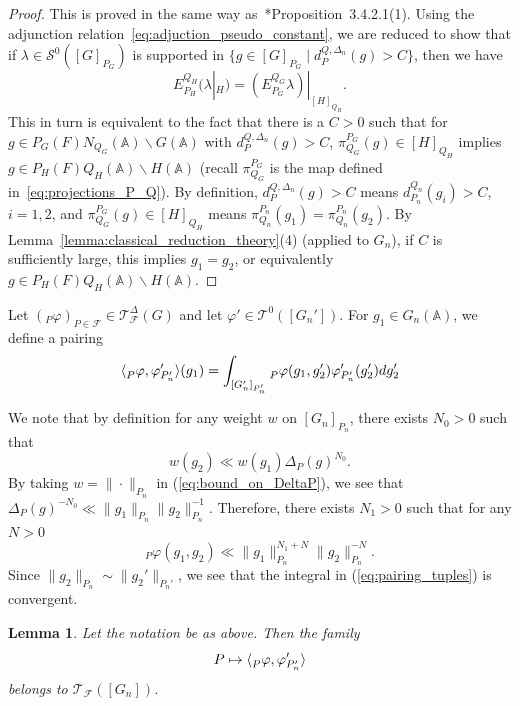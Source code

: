 \documentclass[letterpaper,11pt]{amsart}
\newcommand{\bA}{\mathbb{A}}
\newcommand{\cF}{\mathcal{F}}
\newcommand{\cS}{\mathcal{S}}
\newcommand{\cT}{\mathcal{T}}
\newcommand{\bs}{\backslash}
\newcommand{\<}{\negthickspace}
\theoremstyle{definition}
\theoremstyle{plain}
\newtheorem{lemma}[definition]{Lemma}
\theoremstyle{remark}
\numberwithin{equation}{section}
\begin{document}
\begin{proof}
This is proved in the same way as~\cite{BPCZ}*{Proposition~3.4.2.1(1)}. Using
the adjunction relation~\eqref{eq:adjuction_pseudo_constant}, we are reduced
to show that if $\lambda \in \cS^0([G]_{P_G})$ is supported in $\{ g \in
[G]_{P_{G}} \mid d_{P}^{Q,\Delta_n}(g)>C\}$, then we have
    \[
     E_{P_H}^{Q_H} (\lambda|_H) =
     \left(E_{P_G}^{Q_G} \lambda\right)|_{[H]_{Q_H}}.
    \]
This in turn is equivalent to the fact that there is a $C>0$ such that for $g \in
P_G(F)N_{Q_G}(\bA) \bs G(\bA)$ with $d_P^{Q, \Delta_n}(g)>C$, $\pi_{Q_G}^{P_G}(g) \in [H]_{Q_H}$ implies $g \in P_{H}(F)Q_H(\bA) \bs H(\bA)$ (recall $\pi_{Q_G}^{P_G}$ is the map defined in~\eqref{eq:projections_P_Q}).
By definition, $d_{P}^{Q, \Delta_n}(g)>C$ means $d_{P_n}^{Q_n}(g_i) > C$, $i
= 1, 2$, and $\pi_{Q_G}^{P_G}(g) \in [H]_{Q_H}$ means $\pi_{Q_n}^{P_n}(g_1) =
\pi_{Q_n}^{P_n}(g_2)$. By Lemma~\ref{lemma:classical_reduction_theory}(4)
(applied to $G_n$), if $C$ is sufficiently large, this implies $g_1 = g_2$,
or equivalently $g \in P_{H}(F)Q_H(\bA) \bs H(\bA)$.
\end{proof}

Let $({}_P{\varphi})_{P \in \cF} \in
\cT_{\cF}^{\Delta}(G)$ and let $\varphi' \in \cT^0([G_n'])$.
For $g_1 \in G_n(\bA)$, we define a pairing
    \begin{equation}    \label{eq:pairing_tuples}
    \langle \prescript{}{P}{\varphi}, \varphi'_{P_n'} \rangle (g_1) =
    \int_{[G_n']_{P_n'}} \prescript{}{P}{\varphi}(g_1, g_2')
    \varphi'_{P_n'}(g_2') dg_2'
    \end{equation}

We note that by definition for any weight $w$ on
$[G_n]_{P_n}$, there exists $N_0 > 0$ such that
    \begin{equation} \label{eq:bound_on_DeltaP}
    w(g_2) \ll w(g_1) \Delta_P(g)^{N_0}.
    \end{equation}
By taking $w=\| \cdot \|_{P_n}$ in (\ref{eq:bound_on_DeltaP}), we see that
$\Delta_P(g)^{-N_0}  \ll \| g_1 \|_{P_n} \| g_2 \|^{-1}_{P_n} $. Therefore, there
exists $N_1>0$ such that for any $N>0$
\[ {}_P \varphi(g_1,g_2) \ll \| g_1 \|^{N_1+N}_{P_n} \| g_2\|^{-N}_{P_n}.  \]
Since $\|g_2\|_{P_n} \sim \|g_2'\|_{P_n'}$, we see that the integral in
(\ref{eq:pairing_tuples}) is convergent.

\begin{lemma}    \label{lemma:space_T_pairing}
Let the notation be as above. Then the family
    \[
    P \mapsto \langle \prescript{}{P}{\varphi}, \varphi'_{P_n'} \rangle
    \]
belongs to $\cT_{\cF}([G_n])$.
\end{lemma}
\end{document}

